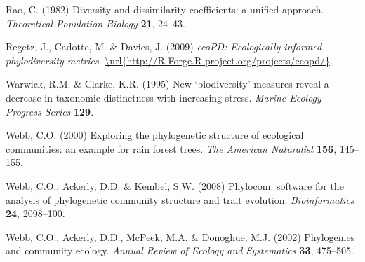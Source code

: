 \documentclass{bioinfo}
\begin{document}
\begin{thebibliography}{30}
Rao, C. (1982) Diversity and dissimilarity coefficients: a unified approach.
  \emph{Theoretical Population Biology} \textbf{21}, 24--43.

Regetz, J., Cadotte, M. \& Davies, J. (2009) \emph{ecoPD: Ecologically-informed
  phylodiversity metrics}.
  \urlprefix\url{\url{http://R-Forge.R-project.org/projects/ecopd/}}.

Warwick, R.M. \& Clarke, K.R. (1995) New `biodiversity' measures reveal a
  decrease in taxonomic distinctness with increasing stress. \emph{Marine
  Ecology Progress Series} \textbf{129}.

Webb, C.O. (2000) {Exploring the phylogenetic structure of ecological
  communities: an example for rain forest trees}. \emph{The American
  Naturalist} \textbf{156}, 145--155.

Webb, C.O., Ackerly, D.D. \& Kembel, S.W. (2008) {Phylocom: software for the
  analysis of phylogenetic community structure and trait evolution.}
  \emph{Bioinformatics} \textbf{24}, 2098--100.

Webb, C.O., Ackerly, D.D., McPeek, M.A. \& Donoghue, M.J. (2002) Phylogenies
  and community ecology. \emph{Annual Review of Ecology and Systematics}
  \textbf{33}, 475--505.

\end{thebibliography}
\end{document}
